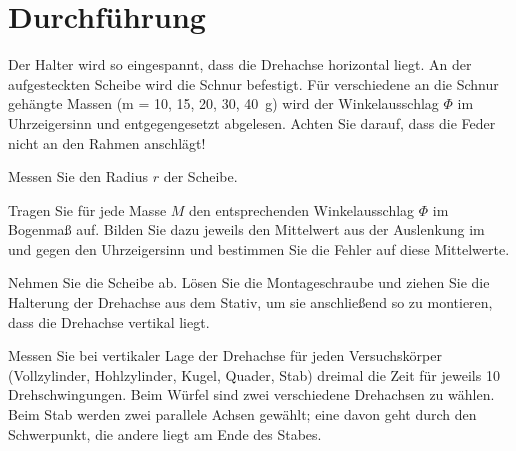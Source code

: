 \section{Durchführung} 

\begin{enumerate}
	\begin{minipage}{0.6\textwidth}
		\item Der Halter wird so eingespannt, dass die Drehachse horizontal liegt. An der aufgesteckten Scheibe wird die Schnur befestigt. Für verschiedene an die Schnur gehängte Massen (m = 10, 15, 20, 30, 40~g) wird der Winkelausschlag $\Phi$ im Uhrzeigersinn und entgegengesetzt abgelesen. Achten Sie darauf, dass die Feder nicht an den Rahmen anschlägt!
		\item Messen Sie den Radius $r$ der Scheibe.
		\item Tragen Sie für jede Masse $M$ den entsprechenden Winkelausschlag $\Phi$ im Bogenmaß auf. Bilden Sie dazu jeweils den Mittelwert aus der Auslenkung im und gegen den Uhrzeigersinn und bestimmen Sie die Fehler auf diese Mittelwerte.
		\item Nehmen Sie die Scheibe ab. Lösen Sie die Montageschraube und ziehen Sie die Halterung der Drehachse aus dem Stativ, um sie anschließend so zu montieren, dass die Drehachse vertikal liegt.
		\item Messen Sie bei vertikaler Lage der Drehachse für jeden Versuchskörper (Vollzylinder, Hohlzylinder, Kugel, Quader, Stab) dreimal die Zeit für jeweils 10 Drehschwingungen. Beim Würfel sind zwei verschiedene Drehachsen zu wählen. Beim Stab werden zwei parallele Achsen gewählt; eine davon geht durch den Schwerpunkt, die andere liegt am Ende des Stabes.
	\end{minipage}\hfill
	\begin{minipage}{0.35\textwidth}
		\centering

\end{minipage}
\end{enumerate}
